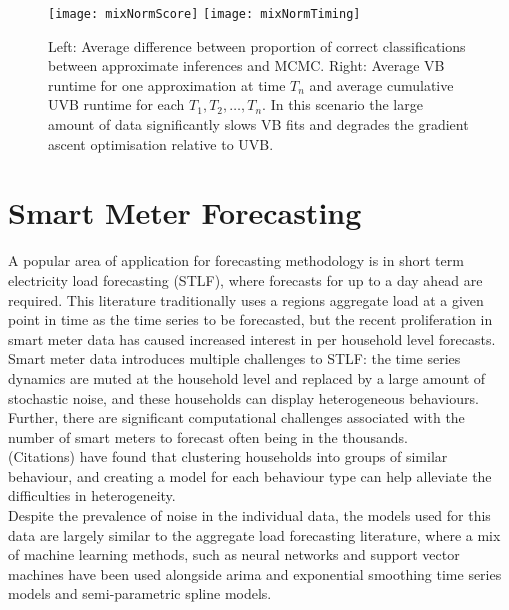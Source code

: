 \documentclass[12pt,a4paper]{article}\usepackage[]{graphicx}\usepackage[]{color}
\begin{document}
\begin{figure}%
    \centering
    {{\texttt{[image: mixNormScore]} }}%
    \qquad
    {{\texttt{[image: mixNormTiming]} }}%
    \caption{Left: Average difference between proportion of correct classifications between approximate inferences and MCMC. Right: Average VB runtime for one approximation at time $T_n$ and average cumulative UVB runtime for each $T_1, T_2, \dots, T_n$. In this scenario the large amount of data significantly slows VB fits and degrades the gradient ascent optimisation relative to UVB.}%
    \label{fig:mixnormResults}%
\end{figure}

\section{Smart Meter Forecasting}

A popular area of application for forecasting methodology is in short term electricity load forecasting (STLF), where forecasts for up to a day ahead are required. This literature traditionally uses a regions aggregate load at a given point in time as the time series to be forecasted, but the recent proliferation in smart meter data has caused increased interest in per household level forecasts. 
\\

Smart meter data introduces multiple challenges to STLF: the time series dynamics are muted at the household level and replaced by a large amount of stochastic noise, and these households can display heterogeneous behaviours. Further, there are significant computational challenges associated with the number of smart meters to forecast often being in the thousands.
\\

(Citations) have found that clustering households into groups of similar behaviour, and creating a model for each behaviour type can help alleviate the difficulties in heterogeneity.
\\

Despite the prevalence of noise in the individual data, the models used for this data are largely similar to the aggregate load forecasting literature, where a mix of machine learning methods, such as neural networks and support vector machines have been used alongside arima and exponential smoothing time series models and semi-parametric spline models.
\\
\end{document}
